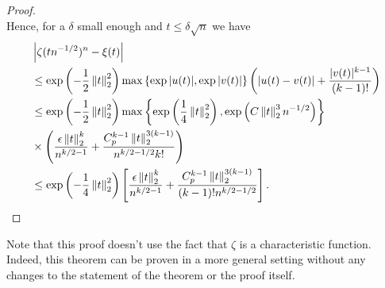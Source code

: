 \begin{proof}
\begin{equation*}
    \end{equation*}
    Hence, for a $\delta$ small enough and $t \leq \delta\sqrt{n}$ we have
    \begin{align*}
        &\left|\zeta(t n^{-1/2})^n - \xi(t)\right| \\
        &\leq \exp\left(-\frac{1}{2}\left\lVert t\right\rVert_2^2\right) \max \left\{ \exp{|u(t)|}, \exp{|v(t)|} \right\}\left(\left|u(t) - v(t)\right| + \frac{|v(t)|^{k-1}}{(k-1)!}\right)\\
        &\leq \exp\left(-\frac{1}{2}\left\lVert t\right\rVert_2^2\right)
            \max \left\{ 
                \exp\left(\frac{1}{4}\left\lVert t\right\rVert_2^2\right),
                \exp\left(C \left\lVert t\right\rVert_2^3 n^{-1/2}\right)
            \right\}\\
        & \times \left(
                \frac{\epsilon\left\lVert t\right\rVert_2^k}{n^{k/2-1}}
                +
                \frac{C_p^{k-1} \left\lVert t\right\rVert_2^{3(k-1)} }{n^{k/2-1/2} k!}
              \right)\\
        & \leq \exp\left(-\frac{1}{4}\left\lVert t\right\rVert_2^2\right)\left[ \frac{\epsilon\left\lVert t\right\rVert_2^k}{n^{k/2-1}} + \frac{C_p^{k-1}\left\lVert t\right\rVert_2^{3(k-1)}}{(k-1)!n^{k/2-1/2}} \right].
    \end{align*}
\end{proof}

Note that this proof doesn't use the fact that $\zeta$ is a characteristic function. Indeed, this theorem can be proven in a more general setting without any changes to the statement of the theorem or the proof itself.